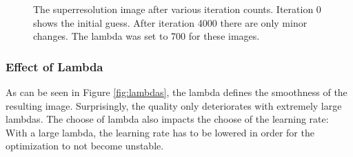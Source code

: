 \documentclass{paper}
\begin{document}
\begin{figure}[ht!]
\caption{The superresolution image after various iteration counts.
Iteration 0 shows the initial guess. After iteration 4000 there are only
minor changes. The lambda was set to 700 for these images.}
\label{fig:iteration_count}
\end{figure}

\subsubsection*{Effect of Lambda}
As can be seen in Figure \ref{fig:lambdas}, the lambda defines the smoothness
of the resulting image. 
Surprisingly, 
the quality only deteriorates with extremely large lambdas. 
The choose of lambda also impacts the choose of the learning rate: 
With a large lambda, the learning rate has to be lowered in order for the
optimization to not become unstable.
\end{document}
